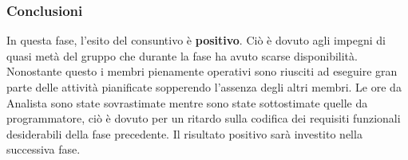 \documentclass[../PianoProgetto.tex]{subfiles}
\begin{document}
	\subsubsection{Conclusioni}	
     In questa fase, l'esito del consuntivo è \textbf{positivo}. 
     Ciò è dovuto agli impegni di quasi metà del gruppo che durante la fase ha avuto scarse disponibilità. Nonostante questo i membri pienamente operativi sono riusciti ad eseguire gran parte delle attività pianificate sopperendo l'assenza degli altri membri. Le ore da Analista sono state sovrastimate mentre sono state sottostimate quelle da programmatore, ciò è dovuto per un ritardo sulla codifica dei requisiti funzionali desiderabili della fase precedente. Il risultato positivo sarà investito nella successiva fase.
    
     
\end{document}
